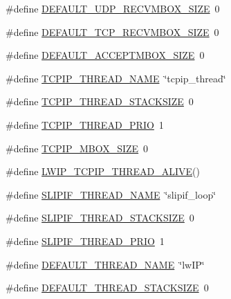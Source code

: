 \begin{DoxyCompactItemize}
\item 
\#define \hyperlink{group__lwip__opts__thread_ga09fe785559b3f0cf108da4440489e335}{D\+E\+F\+A\+U\+L\+T\+\_\+\+U\+D\+P\+\_\+\+R\+E\+C\+V\+M\+B\+O\+X\+\_\+\+S\+I\+ZE}~0
\item 
\#define \hyperlink{group__lwip__opts__thread_ga1bd172938b9c8ba63156fcafc87e83c7}{D\+E\+F\+A\+U\+L\+T\+\_\+\+T\+C\+P\+\_\+\+R\+E\+C\+V\+M\+B\+O\+X\+\_\+\+S\+I\+ZE}~0
\item 
\#define \hyperlink{group__lwip__opts__thread_ga5d5a6e04abe2ec233c7acdb09f992461}{D\+E\+F\+A\+U\+L\+T\+\_\+\+A\+C\+C\+E\+P\+T\+M\+B\+O\+X\+\_\+\+S\+I\+ZE}~0
\item 
\#define \hyperlink{group__lwip__opts__thread_ga405e604e4328e1feb878c6fe1798a587}{T\+C\+P\+I\+P\+\_\+\+T\+H\+R\+E\+A\+D\+\_\+\+N\+A\+ME}~\char`\"{}tcpip\+\_\+thread\char`\"{}
\item 
\#define \hyperlink{group__lwip__opts__thread_gaa02b84eafa0c8b09b158b97c96d79db0}{T\+C\+P\+I\+P\+\_\+\+T\+H\+R\+E\+A\+D\+\_\+\+S\+T\+A\+C\+K\+S\+I\+ZE}~0
\item 
\#define \hyperlink{group__lwip__opts__thread_ga42b2c7a3042d7c3efd00f367f5837435}{T\+C\+P\+I\+P\+\_\+\+T\+H\+R\+E\+A\+D\+\_\+\+P\+R\+IO}~1
\item 
\#define \hyperlink{group__lwip__opts__thread_ga8cf210ad4e4bf616860a45fbd140fd06}{T\+C\+P\+I\+P\+\_\+\+M\+B\+O\+X\+\_\+\+S\+I\+ZE}~0
\item 
\#define \hyperlink{group__lwip__opts__thread_ga8b99d75d9e0a0868567d10c8522915bb}{L\+W\+I\+P\+\_\+\+T\+C\+P\+I\+P\+\_\+\+T\+H\+R\+E\+A\+D\+\_\+\+A\+L\+I\+VE}()
\item 
\#define \hyperlink{group__lwip__opts__thread_gae9cd260c56472324a2f0ee5f9597a675}{S\+L\+I\+P\+I\+F\+\_\+\+T\+H\+R\+E\+A\+D\+\_\+\+N\+A\+ME}~\char`\"{}slipif\+\_\+loop\char`\"{}
\item 
\#define \hyperlink{group__lwip__opts__thread_gae8ab54a25007ce997bbab6289815e258}{S\+L\+I\+P\+I\+F\+\_\+\+T\+H\+R\+E\+A\+D\+\_\+\+S\+T\+A\+C\+K\+S\+I\+ZE}~0
\item 
\#define \hyperlink{group__lwip__opts__thread_gab1b9fc2efcbf1f804bfd0191bc019c4e}{S\+L\+I\+P\+I\+F\+\_\+\+T\+H\+R\+E\+A\+D\+\_\+\+P\+R\+IO}~1
\item 
\#define \hyperlink{group__lwip__opts__thread_gaca13123a5c8271558353e04123957616}{D\+E\+F\+A\+U\+L\+T\+\_\+\+T\+H\+R\+E\+A\+D\+\_\+\+N\+A\+ME}~\char`\"{}lw\+IP\char`\"{}
\item 
\#define \hyperlink{group__lwip__opts__thread_ga7f93dfeaed4021061959f822def602cb}{D\+E\+F\+A\+U\+L\+T\+\_\+\+T\+H\+R\+E\+A\+D\+\_\+\+S\+T\+A\+C\+K\+S\+I\+ZE}~0

\end{DoxyCompactItemize}
